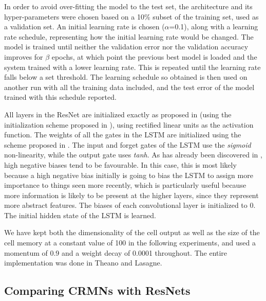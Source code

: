 \documentclass{article}
\begin{document}
In order to avoid over-fitting the model to the test set, the architecture and its hyper-parameters were chosen based on a 10\% subset of the training set, used as a validation set. %
    An initial learning rate is chosen (\(\alpha\)=0.1), along with a learning rate schedule, representing how the initial learning rate would be changed.
    The model is trained until neither the validation error nor the validation accuracy improves for \(\beta\) epochs, at which point the previous best model is loaded and the system trained with a lower learning rate. This is repeated until the learning rate falls below a set threshold.
    The learning schedule so obtained is then used on another run with all the training data included, and the test error of the model trained with this schedule reported.


All layers in the ResNet are initialized exactly as proposed in \cite{he2015deep} (using the initialization scheme proposed in \cite{he2015delving}), using rectified linear units as the activation function. The weights of all the gates in the LSTM are initialized using the scheme proposed in \cite{saxe2013exact}. The input and forget gates of the LSTM use the \emph{sigmoid} non-linearity, while the output gate uses \emph{tanh}. As has already been discovered in \cite{srivastava2015training}, high negative biases tend to be favourable. In this case, this is most likely because a high negative bias initially is going to bias the LSTM to assign more importance to things seen more recently, which is particularly useful because more information is likely to be present at the higher layers, since they represent more abstract features. The biases of each convolutional layer is initialized to 0. The initial hidden state of the LSTM is learned.

We have kept both the dimensionality of the cell output as well as the size of the cell memory at a constant value of 100 in the following experiments, and used a momentum of 0.9 and a weight decay of 0.0001 throughout. The entire implementation was done in Theano \cite{2016arXiv160502688short} and Lasagne.

\subsection{Comparing CRMNs with ResNets}
\end{document}
